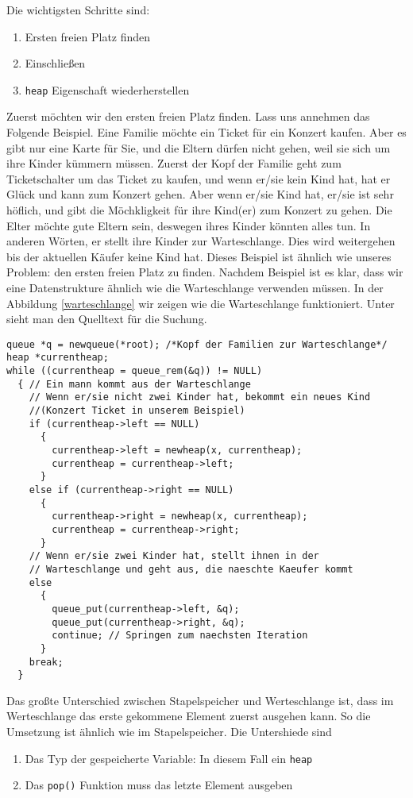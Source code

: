 Die wichtigsten Schritte sind:
\begin{enumerate}
\item Ersten freien Platz finden
\item Einschließen
\item \texttt{heap} Eigenschaft wiederherstellen
\end{enumerate}
Zuerst möchten wir den ersten freien Platz finden. Lass uns annehmen
das Folgende Beispiel. Eine Familie möchte ein Ticket für ein Konzert kaufen.
Aber es gibt nur eine Karte für Sie, und die Eltern dürfen nicht gehen, weil sie sich 
um ihre Kinder kümmern müssen. Zuerst der Kopf der Familie geht zum Ticketschalter
um das Ticket zu kaufen, und wenn er/sie  kein Kind hat, hat er Glück und
kann zum Konzert gehen. Aber wenn er/sie Kind hat, er/sie ist sehr höflich, und 
gibt die Möchkligkeit für ihre Kind(er) zum Konzert zu gehen. Die Elter möchte 
gute Eltern sein, deswegen ihres Kinder könnten alles tun. In anderen Wörten, er
stellt ihre Kinder zur Warteschlange. Dies wird weitergehen bis der aktuellen Käufer 
keine Kind hat. Dieses Beispiel ist ähnlich wie unseres Problem: den ersten freien 
Platz zu finden. Nachdem Beispiel ist es klar, dass wir eine Datenstrukture ähnlich wie 
die Warteschlange verwenden müssen. In der Abbildung \ref{warteschlange} wir zeigen wie 
die Warteschlange funktioniert. Unter sieht man den Quelltext für die Suchung.


\begin{lstlisting}
queue *q = newqueue(*root); /*Kopf der Familien zur Warteschlange*/
heap *currentheap;
while ((currentheap = queue_rem(&q)) != NULL)
  { // Ein mann kommt aus der Warteschlange
    // Wenn er/sie nicht zwei Kinder hat, bekommt ein neues Kind
    //(Konzert Ticket in unserem Beispiel)
    if (currentheap->left == NULL)
      {
        currentheap->left = newheap(x, currentheap);
        currentheap = currentheap->left;
      }
    else if (currentheap->right == NULL)
      {
        currentheap->right = newheap(x, currentheap);
        currentheap = currentheap->right;
      }
    // Wenn er/sie zwei Kinder hat, stellt ihnen in der
    // Warteschlange und geht aus, die naeschte Kaeufer kommt
    else
      {
        queue_put(currentheap->left, &q);
        queue_put(currentheap->right, &q);
        continue; // Springen zum naechsten Iteration
      }
    break;
  }
\end{lstlisting}


Das großte Unterschied zwischen Stapelspeicher und 
Werteschlange ist, dass im Werteschlange das erste gekommene Element zuerst ausgehen kann. 
So die Umsetzung ist ähnlich wie im Stapelspeicher. Die Untershiede sind
\begin{enumerate}
\item Das Typ der gespeicherte Variable: In diesem Fall ein \texttt{heap}
\item Das \texttt{pop()} Funktion muss das letzte Element ausgeben
\end{enumerate}


